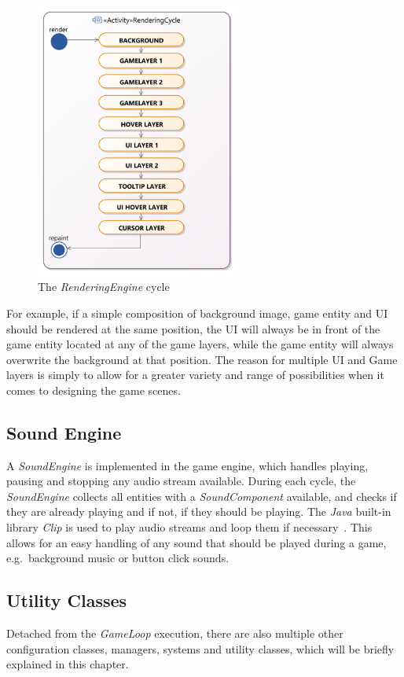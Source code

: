 \begin{figure}
    \centering
    \includegraphics[width=0.6\textwidth]{Pictures/res/implementation/RenderLayers}
    \caption{The \textit{RenderingEngine} cycle}
    \label{fig:render-cycle}
\end{figure}
For example, if a simple composition of background image, game entity and \gls{UI} should be rendered at the same position,
the \gls{UI} will always be in front of the game entity located at any of the game layers,
while the game entity will always overwrite the background at that position.
The reason for multiple \gls{UI} and Game layers is simply to allow for a greater variety and range of possibilities when it comes to designing the game scenes.
\subsection{Sound Engine}\label{subsec:sound-engine}
A \textit{SoundEngine} is implemented in the game engine, which handles playing, pausing and stopping any audio stream available.
During each cycle, the \textit{SoundEngine} collects all entities with a \textit{SoundComponent} available, and checks if they are already playing and if not, if they should be playing.
The \textit{Java} built-in library \textit{Clip} is used to play audio streams and loop them if necessary~\cite{clip}.
This allows for an easy handling of any sound that should be played during a game, e.g.\ background music or button click sounds.

\subsection{Utility Classes}\label{subsec:utility-classes}
Detached from the \textit{GameLoop} execution, there are also multiple other configuration classes, managers, systems and utility classes, which will be briefly explained in this chapter.
